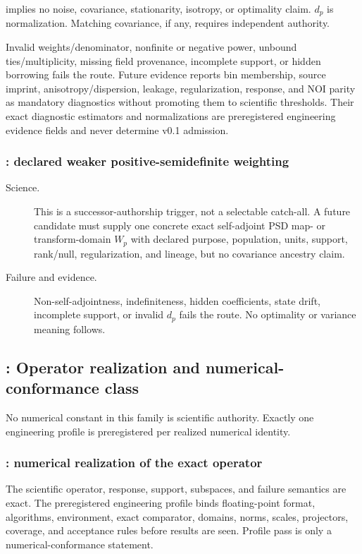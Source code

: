 \begin{description}
implies no noise, covariance, stationarity, isotropy, or optimality claim.
$d_p$ is normalization. Matching covariance, if any, requires independent
authority.
\item[Failure and evidence.] Invalid weights/denominator, nonfinite or negative
power, unbound ties/multiplicity, missing field provenance, incomplete support,
or hidden borrowing fails the route. Future evidence reports bin membership,
source imprint, anisotropy/dispersion, leakage, regularization, response, and
NOI parity as mandatory diagnostics without promoting them to scientific
thresholds. Their exact diagnostic estimators and normalizations are
preregistered engineering evidence fields and never determine v0.1 admission.
\end{description}

\subsubsection{: declared weaker positive-semidefinite weighting}
\begin{description}
\item[Science.] This is a successor-authorship trigger, not a selectable
catch-all. A future candidate must supply one concrete exact self-adjoint PSD
map- or transform-domain $W_p$ with declared purpose, population, units,
support, rank/null, regularization, and lineage, but no covariance ancestry
claim.
\item[Failure and evidence.] Non-self-adjointness, indefiniteness, hidden
coefficients, state drift, incomplete support, or invalid $d_p$ fails the
route. No optimality or variance meaning follows.
\end{description}

\subsection{: Operator realization and numerical-conformance class}

No numerical constant in this family is scientific authority. Exactly one
engineering profile is preregistered per realized numerical identity.

\subsubsection{: numerical realization of the exact operator}
The scientific operator, response, support, subspaces, and failure semantics
are exact. The preregistered engineering profile binds floating-point format,
algorithms, environment, exact comparator, domains, norms, scales, projectors,
coverage, and acceptance rules before results are seen. Profile pass is only a
numerical-conformance statement.

